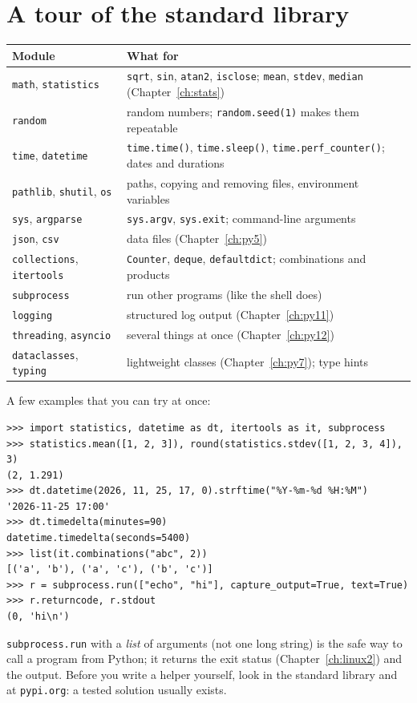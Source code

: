 \section*{A tour of the standard library}
\begin{center}
\renewcommand{\arraystretch}{1.2}
\begin{tabular}{p{2.8cm}p{10.2cm}}
\textbf{Module} & \textbf{What for}\\ \hline
\texttt{math}, \texttt{statistics} & \texttt{sqrt}, \texttt{sin}, \texttt{atan2}, \texttt{isclose}; \texttt{mean}, \texttt{stdev}, \texttt{median} (Chapter~\ref{ch:stats})\\
\texttt{random} & random numbers; \texttt{random.seed(1)} makes them repeatable\\
\texttt{time}, \texttt{datetime} & \texttt{time.time()}, \texttt{time.sleep()}, \texttt{time.perf\_counter()}; dates and durations\\
\texttt{pathlib}, \texttt{shutil}, \texttt{os} & paths, copying and removing files, environment variables\\
\texttt{sys}, \texttt{argparse} & \texttt{sys.argv}, \texttt{sys.exit}; command-line arguments\\
\texttt{json}, \texttt{csv} & data files (Chapter~\ref{ch:py5})\\
\texttt{collections}, \texttt{itertools} & \texttt{Counter}, \texttt{deque}, \texttt{defaultdict}; combinations and products\\
\texttt{subprocess} & run other programs (like the shell does)\\
\texttt{logging} & structured log output (Chapter~\ref{ch:py11})\\
\texttt{threading}, \texttt{asyncio} & several things at once (Chapter~\ref{ch:py12})\\
\texttt{dataclasses}, \texttt{typing} & lightweight classes (Chapter~\ref{ch:py7}); type hints\\
\end{tabular}
\end{center}
A few examples that you can try at once:
\begin{verbatim}
>>> import statistics, datetime as dt, itertools as it, subprocess
>>> statistics.mean([1, 2, 3]), round(statistics.stdev([1, 2, 3, 4]), 3)
(2, 1.291)
>>> dt.datetime(2026, 11, 25, 17, 0).strftime("%Y-%m-%d %H:%M")
'2026-11-25 17:00'
>>> dt.timedelta(minutes=90)
datetime.timedelta(seconds=5400)
>>> list(it.combinations("abc", 2))
[('a', 'b'), ('a', 'c'), ('b', 'c')]
>>> r = subprocess.run(["echo", "hi"], capture_output=True, text=True)
>>> r.returncode, r.stdout
(0, 'hi\n')
\end{verbatim}
\texttt{subprocess.run} with a \emph{list} of arguments (not one long string) is the safe way to call a program from Python; it returns the exit status (Chapter~\ref{ch:linux2}) and the output. Before you write a helper yourself, look in the standard library and at \texttt{pypi.org}: a tested solution usually exists.

